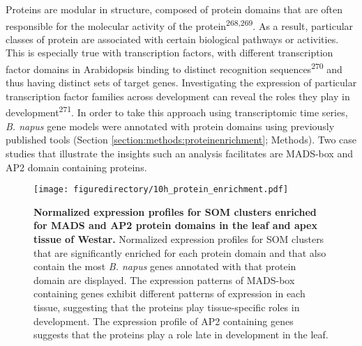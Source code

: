 \documentclass[12pt,]{book}
\begin{document}
Proteins are modular in structure, composed of protein domains that are
often responsible for the molecular activity of the
protein\textsuperscript{268,269}. As a result, particular classes of
protein are associated with certain biological pathways or activities.
This is especially true with transcription factors, with different
transcription factor domains in Arabidopsis binding to distinct
recognition sequences\textsuperscript{270} and thus having distinct sets
of target genes. Investigating the expression of particular
transcription factor families across development can reveal the roles
they play in development\textsuperscript{271}. In order to take this
approach using transcriptomic time series, \emph{B. napus} gene models
were annotated with protein domains using previously published tools
(Section \ref{section:methods:proteinenrichment}; Methods). Two case
studies that illustrate the insights such an analysis facilitates are
MADS-box and AP2 domain containing proteins.

\begin{figure}[htbp]
\centering
\texttt{[image: figuredirectory/10h\_protein\_enrichment.pdf]}
\caption{\textbf{Normalized expression profiles for SOM clusters
enriched for MADS and AP2 protein domains in the leaf and apex tissue of
Westar.} Normalized expression profiles for SOM clusters that are
significantly enriched for each protein domain and that also contain the
most \emph{B. napus} genes annotated with that protein domain are
displayed. The expression patterns of MADS-box containing genes exhibit
different patterns of expression in each tissue, suggesting that the
proteins play tissue-specific roles in development. The expression
profile of AP2 containing genes suggests that the proteins play a role
late in development in the leaf.}\label{figure:222:proteinsom}
\end{figure}
\end{document}
